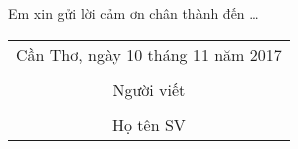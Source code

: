 \documentclass[./thesis.tex]{subfiles}
\begin{document}
Em xin gửi lời cảm ơn chân thành đến \ldots

\hspace*{\fill}
\begin{tabular}{@{}c@{}} 

\\Cần Thơ, ngày 10 tháng 11 năm 2017\\ \\
Người viết\\ \\
Họ tên SV
\end{tabular}
\end{document}
